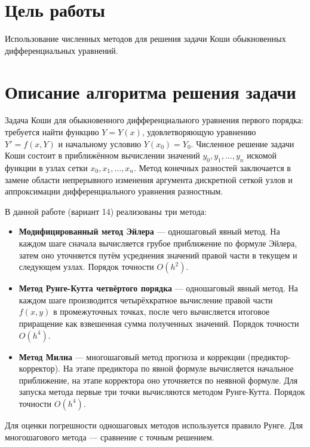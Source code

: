 \section{Цель работы}

Использование численных методов для решения задачи Коши обыкновенных дифференциальных уравнений.

\section{Описание алгоритма решения задачи}

Задача Коши для обыкновенного дифференциального уравнения первого порядка: требуется найти функцию $Y = Y(x)$, удовлетворяющую уравнению $Y' = f(x, Y)$ и начальному условию $Y(x_0) = Y_0$. Численное решение задачи Коши состоит в приближённом вычислении значений $y_0, y_1, \dots, y_n$ искомой функции в узлах сетки $x_0, x_1, \ldots, x_n$. Метод конечных разностей заключается в замене области непрерывного изменения аргумента дискретной сеткой узлов и аппроксимации дифференциального уравнения разностным.

В данной работе (вариант 14) реализованы три метода:

\begin{itemize}
\item \textbf{Модифицированный метод Эйлера} — одношаговый явный метод. На каждом шаге сначала вычисляется грубое приближение по формуле Эйлера, затем оно уточняется путём усреднения значений правой части в текущем и следующем узлах. Порядок точности $O(h^2)$.

\item \textbf{Метод Рунге-Кутта четвёртого порядка} — одношаговый явный метод. На каждом шаге производится четырёхкратное вычисление правой части $f(x, y)$ в промежуточных точках, после чего вычисляется итоговое приращение как взвешенная сумма полученных значений. Порядок точности $O(h^4)$.

\item \textbf{Метод Милна} — многошаговый метод прогноза и коррекции (предиктор-корректор). На этапе предиктора по явной формуле вычисляется начальное приближение, на этапе корректора оно уточняется по неявной формуле. Для запуска метода первые три точки вычисляются методом Рунге-Кутта. Порядок точности $O(h^4)$.
\end{itemize}

Для оценки погрешности одношаговых методов используется правило Рунге. Для многошагового метода — сравнение с точным решением.

